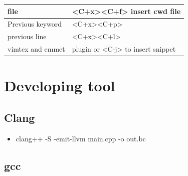 \documentclass[a4paper,12pt,twoside]{book}
\begin{document}
\begin{itemize}
\begin{tabular}{p{}|p{}}
\hline 
file & <C+x><C+f> insert cwd file  \\ 

\hline
Previous keyword & <C+x><C+p> \\

\hline
previous line & <C+x><C+l> \\

\hline 
vimtex and emmet & plugin or <C-j> to insert snippet\\

\hline
\end{tabular}

\end{itemize}



\chapter{Developing tool}

\section{Clang}
\begin{itemize}
\item clang++ -S -emit-llvm main.cpp -o out.bc
\end{itemize}

\section{gcc}
\end{document}
